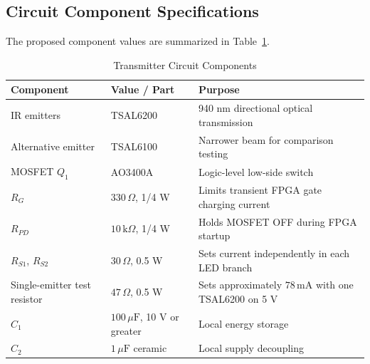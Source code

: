 \documentclass[a4paper,12pt]{article}
\begin{document}
\subsection{Circuit Component Specifications}

The proposed component values are summarized in
Table~\ref{tab:circuit_components}.

\begin{table}[H]
    \centering
    \caption{Transmitter Circuit Components}
    \label{tab:circuit_components}

    \begin{tabular}{@{}p{3.1cm}p{4.1cm}p{5.7cm}@{}}
        \toprule

        \textbf{Component} &
        \textbf{Value / Part} &
        \textbf{Purpose} \\

        \midrule

        IR emitters &
        TSAL6200 \cite{tsal6200} &
        940 nm directional optical transmission  \\

        Alternative emitter &
        TSAL6100 \cite{tsal6100}  &
        Narrower beam for comparison testing \\

        MOSFET \(Q_1\) &
        AO3400A \cite{ao3400a} &
        Logic-level low-side switch \\

        \(R_G\) &
        \(330\,\Omega\), 1/4 W \cite{Rg}&
        Limits transient FPGA gate charging current \\

        \(R_{PD}\) &
        \(10\,\text{k}\Omega\), 1/4 W \cite{Rpd} &
        Holds MOSFET OFF during FPGA startup \\

        \(R_{S1}\), \(R_{S2}\) &
        \(30\,\Omega\), 0.5 W \cite{RS} &
        Sets current independently in each LED branch \\

        Single-emitter test resistor &
        \(47\,\Omega\), 0.5 W &
        Sets approximately \(78\,\text{mA}\) with one TSAL6200 on 5 V \\

        \(C_1\) &
        \(100\,\mu\text{F}\), 10 V or greater &
        Local energy storage \\

        \(C_2\) &
        \(1\,\mu\text{F}\) ceramic &
        Local supply decoupling \\


\end{tabular}
\end{table}
\end{document}
